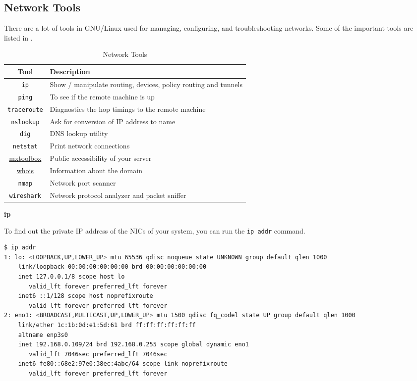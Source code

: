 \subsection{Network Tools}

There are a lot of tools in GNU/Linux used for managing,
configuring, and troubleshooting networks. Some of the
important tools are listed in .

\begin{table*}[h!]
  \caption{Network Tools}
  \begin{tabular}{c l}
    \toprule
    \textbf{Tool} & \textbf{Description} \\
    \midrule
    \texttt{ip} & Show / manipulate routing, devices, policy routing and tunnels \\
    \texttt{ping} & To see if the remote machine is up \\
    \texttt{traceroute} & Diagnostics the hop timings to the remote machine \\
    \texttt{nslookup} & Ask for conversion of IP address to name \\
    \texttt{dig} & DNS lookup utility \\
    \texttt{netstat} & Print network connections \\
    \href{https://mxtoolbox.com/}{mxtoolbox} & Public accessibility of your server \\
    \href{https://whois.com/}{whois} & Information about the domain \\
    \texttt{nmap} & Network port scanner \\
    \texttt{wireshark} & Network protocol analyzer and packet sniffer \\
    \bottomrule
  \end{tabular}
\end{table*}

\textbf{ip}

To find out the private IP address of the NICs of your system,
you can run the \texttt{ip addr} command.

\begin{lstlisting}[language=bash]
$ ip addr
1: lo: <LOOPBACK,UP,LOWER_UP> mtu 65536 qdisc noqueue state UNKNOWN group default qlen 1000
    link/loopback 00:00:00:00:00:00 brd 00:00:00:00:00:00
    inet 127.0.0.1/8 scope host lo
       valid_lft forever preferred_lft forever
    inet6 ::1/128 scope host noprefixroute
       valid_lft forever preferred_lft forever
2: eno1: <BROADCAST,MULTICAST,UP,LOWER_UP> mtu 1500 qdisc fq_codel state UP group default qlen 1000
    link/ether 1c:1b:0d:e1:5d:61 brd ff:ff:ff:ff:ff:ff
    altname enp3s0
    inet 192.168.0.109/24 brd 192.168.0.255 scope global dynamic eno1
       valid_lft 7046sec preferred_lft 7046sec
    inet6 fe80::68e2:97e0:38ec:4abc/64 scope link noprefixroute
       valid_lft forever preferred_lft forever
\end{lstlisting}

